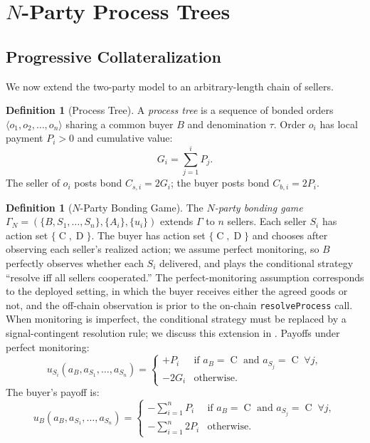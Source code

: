 \documentclass[11pt,a4paper]{article}
\theoremstyle{definition}
\newtheorem{definition}[theorem]{Definition}
\theoremstyle{remark}
\newcommand{\pay}{P}           %
\newcommand{\cumval}{G}        %
\newcommand{\ub}{u_B}          %
\DeclareMathOperator{\Coop}{C}
\DeclareMathOperator{\Def}{D}
\begin{document}
\section{$N$-Party Process Trees}
\label{sec:process-trees}

\subsection{Progressive Collateralization}

We now extend the two-party model to an arbitrary-length chain of
sellers.

\begin{definition}[Process Tree]
\label{def:process-tree}
A \emph{process tree} is a sequence of bonded orders
$\langle o_1, o_2, \ldots, o_n \rangle$ sharing a common buyer $B$ and
denomination $\tau$. Order $o_i$ has local payment $\pay_i > 0$ and
cumulative value:
\begin{equation}
  \cumval_i = \sum_{j=1}^{i} \pay_j.
  \label{eq:cumulative}
\end{equation}
The seller of $o_i$ posts bond $C_{s,i} = 2\cumval_i$; the buyer
posts bond $C_{b,i} = 2\pay_i$.
\end{definition}

\begin{definition}[$N$-Party Bonding Game]
\label{def:n-party-game}
The \emph{$N$-party bonding game}
$\Gamma_N = (\{B, S_1, \ldots, S_n\}, \{A_i\}, \{u_i\})$
extends $\Gamma$ to $n$ sellers. Each seller $S_i$ has action set
$\{\Coop, \Def\}$. The buyer has action set $\{\Coop, \Def\}$ and
chooses after observing each seller's realized action; we assume
perfect monitoring, so $B$ perfectly observes whether each $S_i$
delivered, and plays the conditional strategy ``resolve iff all
sellers cooperated.'' The perfect-monitoring assumption
corresponds to the deployed setting, in which the buyer receives
either the agreed goods or not, and the off-chain observation is
prior to the on-chain \texttt{resolveProcess} call. When
monitoring is imperfect, the conditional strategy must be replaced
by a signal-contingent resolution rule; we discuss this extension
in . Payoffs under perfect monitoring:
\begin{equation}\label{eq:n-party-seller-utility}
  u_{S_i}(a_B, a_{S_1}, \ldots, a_{S_n}) =
  \begin{cases}
    +\pay_i & \text{if } a_B = \Coop \text{ and } a_{S_j} = \Coop
      \;\forall j, \\
    -2\cumval_i & \text{otherwise}.
  \end{cases}
\end{equation}
The buyer's payoff is:
\begin{equation}\label{eq:n-party-buyer-utility}
  \ub(a_B, a_{S_1}, \ldots, a_{S_n}) =
  \begin{cases}
    -\sum_{i=1}^{n} \pay_i & \text{if } a_B = \Coop \text{ and }
      a_{S_j} = \Coop \;\forall j, \\
    -\sum_{i=1}^{n} 2\pay_i & \text{otherwise}.
  \end{cases}
\end{equation}
\end{definition}
\end{document}
